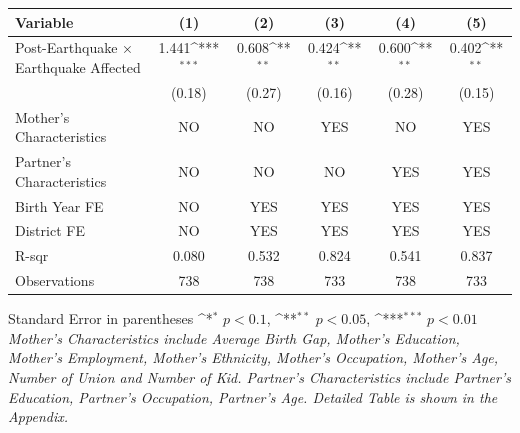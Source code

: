 \def\sym#1{\ifmmode^{#1}\else\(^{#1}\)\fi}
\renewcommand{\arraystretch}{1.4}
\small
\setlength{\tabcolsep}{8pt}

\begin{flushleft}
\begin{tabular}{@{}p{7.5cm}*{5}{c}@{}}  %
\hline\hline
Variable & (1) & (2) & (3) & (4) & (5) \\
\hline
Post-Earthquake × Earthquake Affected & 1.441\sym{***} & 0.608\sym{**} & 0.424\sym{**} & 0.600\sym{**} & 0.402\sym{**} \\
                    & (0.18) & (0.27) & (0.16) & (0.28) & (0.15) \\
\hline
Mother's Characteristics & NO & NO & YES & NO & YES \\
Partner's Characteristics & NO & NO & NO & YES & YES \\
\hline
Birth Year FE & NO & YES & YES & YES & YES \\
District FE & NO & YES & YES & YES & YES \\
R-sqr & 0.080 & 0.532 & 0.824 & 0.541 & 0.837 \\
Observations & 738 & 738 & 733 & 738 & 733 \\
\hline\hline
\end{tabular}
\vspace{3pt}

\noindent\footnotesize
Standard Error in parentheses \sym{*} \(p<0.1\), \sym{**} \(p<0.05\), \sym{***} \(p<0.01\)\\
\textit{Mother’s Characteristics include Average Birth Gap, Mother’s Education, Mother’s Employment, Mother’s Ethnicity, Mother’s Occupation, Mother’s Age, Number of Union and Number of Kid. Partner’s Characteristics include Partner’s Education, Partner’s Occupation, Partner’s Age. Detailed Table is shown in the Appendix.}
\end{flushleft}
